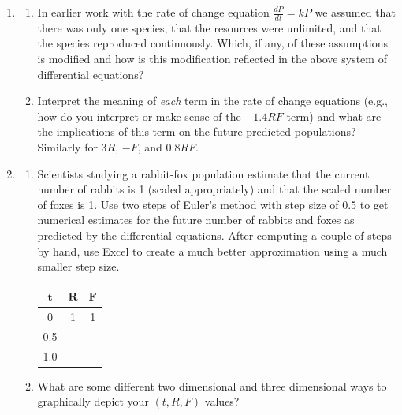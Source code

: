 \begin{enumerate}
\item \label{09problem1}
\begin{enumerate}
\item In earlier work with the rate of change equation $\frac{dP}{dt}=kP$  we assumed that there was only one species, that the resources were unlimited, and that the species reproduced continuously. Which, if any, of these assumptions is modified and how is this modification reflected in the above system of differential equations? \label{09problem1parta} \vfill

\item   Interpret the meaning of \emph{each} term in the rate of change equations (e.g., how do you interpret or make sense of the $-1.4RF$ term) and what are the implications of this term on the future predicted populations? Similarly for $3R$, $-F$, and $0.8RF$. \label{09problem1partb}
\vfill

\end{enumerate}
\item \label{09problem2}
\begin{enumerate}
\item Scientists studying a rabbit-fox population estimate that the current number of rabbits is 1 (scaled appropriately) and that the scaled number of foxes is 1. Use two steps of Euler's method with step size of 0.5 to get numerical estimates for the future number of rabbits and foxes as predicted by the differential equations. After computing a couple of steps by hand, use Excel to create a much better approximation using a much smaller step size. \label{09problem2parta}

\begin{tabular}{|c|c|c|}
\hline
 $\mathbf{t}$	& $\mathbf{R}$	& $\mathbf{F}$\\\hline
 0	& 1	& 1\\\hline
0.5	&&	\\\hline
1.0	&&	\\\hline		
\end{tabular}
\vfill

\item	What are some different two dimensional and three dimensional ways to graphically depict your $(t, R, F)$ values? \label{09problem2partb}

\vfill
\end{enumerate}
\end{enumerate}
\clearpage

